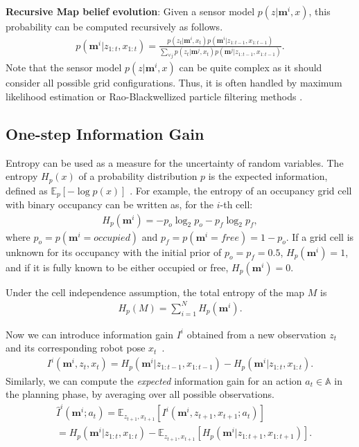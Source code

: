 \documentclass[letterpaper, 10 pt, conference]{ieeeconf}  %
\newcommand{\ph}[1]{{\textbf{#1}:}} %
\begin{document}
\ph{Recursive Map belief evolution} Given a sensor model $p(z | \mathbf{m}^i, x)$, this probability can be computed recursively as follows.
\begin{align}
  p(\mathbf{m}^i | z_{1:t}, x_{1:t}) =
  \frac{p(z_t | \mathbf{m}^i, x_{t}) p(\mathbf{m}^i | z_{1:t-1}, x_{1:t-1})}
       {\sum_{\forall j} p(z_t | \mathbf{m}^j, x_{t}) p(\mathbf{m}^j | z_{1:t-1}, x_{1:t-1})}.
\end{align}
Note that the sensor model $p(z | \mathbf{m}^i, x)$ can be quite complex as it should consider all possible grid configurations.
Thus, it is often handled by maximum likelihood estimation or Rao-Blackwellized particle filtering methods \cite{burgard2005coordinated,stachniss2005information}.

\subsection{One-step Information Gain}
Entropy can be used as a measure for the uncertainty of random variables.
The entropy $H_p(x)$ of a probability distribution $p$ is the expected information, defined as $\mathbb{E}_p[-\log p(x)]$ \cite{cover2012elements}.
For example, the entropy of an occupancy grid cell with binary occupancy can be written as, for the $i$-th cell:
\begin{align}
  H_p(\mathbf{m}^i) = -p_o \log_2 p_{o} - p_f \log_2 p_f,
\end{align}
where $p_o = p(\mathbf{m}^i = occupied)$ and $p_f = p(\mathbf{m}^i = free) = 1 - p_o$.
If a grid cell is unknown for its occupancy with the initial prior of $p_o = p_f = 0.5$, $H_p(\mathbf{m}^i) = 1$, and if it is fully known to be either occupied or free, $H_{p}(\mathbf{m}^i) = 0$.
%

Under the cell independence assumption, the total entropy of the map $M$ is
\begin{align}
  H_p(M) = \textstyle \sum_{i = 1}^N H_{p}(\mathbf{m}^i).
\end{align}

Now we can introduce information gain $I^i$ obtained from a new observation $z_t$ and its corresponding robot pose $x_t$~\cite{cover2012elements}.
\begin{align}
  I^i(\mathbf{m}^i, z_t, x_t) = H_p(\mathbf{m}^i | z_{1:t-1}, x_{1:t-1}) - H_p(\mathbf{m}^i | z_{1:t}, x_{1:t}).
\end{align}
Similarly, we can compute the \textit{expected} information gain for an action $a_t \in \mathbb{A}$ in the planning phase, by averaging over all possible observations.
\begin{align}
  &\hat{I}^i(\mathbf{m}^i; a_t)
  = \mathbb{E}_{z_{t+1}, x_{t+1}} [ I^i (\mathbf{m}^i, z_{t+1}, x_{t+1}; a_t) ] \nonumber \\
  &\!\!= H_p(\mathbf{m}^i | z_{1:t}, x_{1:t}) - \mathbb{E}_{z_{t+1}, x_{t+1}} [ H_p (\mathbf{m}^i | z_{1:t+1}, x_{1:t+1}) ].
\end{align}
\end{document}
